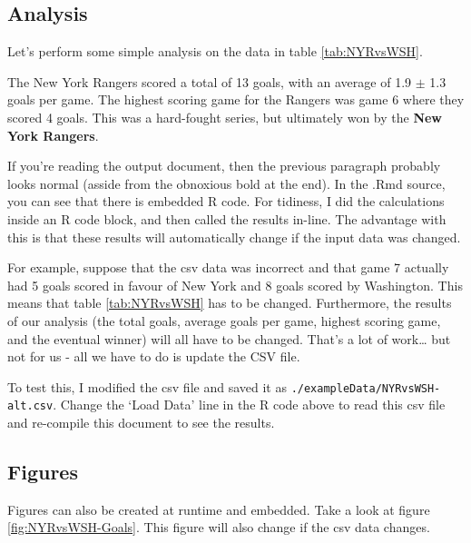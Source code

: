 \documentclass[]{article}
\begin{document}
\subsection{Analysis}\label{analysis}

Let's perform some simple analysis on the data in table
\ref{tab:NYRvsWSH}.

The New York Rangers scored a total of 13 goals, with an average of 1.9
\(\pm\) 1.3 goals per game. The highest scoring game for the Rangers was
game 6 where they scored 4 goals. This was a hard-fought series, but
ultimately won by the \textbf{New York Rangers}.

If you're reading the output document, then the previous paragraph
probably looks normal (asside from the obnoxious bold at the end). In
the .Rmd source, you can see that there is embedded R code. For
tidiness, I did the calculations inside an R code block, and then called
the results in-line. The advantage with this is that these results will
automatically change if the input data was changed.

For example, suppose that the csv data was incorrect and that game 7
actually had 5 goals scored in favour of New York and 8 goals scored by
Washington. This means that table \ref{tab:NYRvsWSH} has to be changed.
Furthermore, the results of our analysis (the total goals, average goals
per game, highest scoring game, and the eventual winner) will all have
to be changed. That's a lot of work\ldots{} but not for us - all we have
to do is update the CSV file.

To test this, I modified the csv file and saved it as
\texttt{./exampleData/NYRvsWSH-alt.csv}. Change the `Load Data' line in
the R code above to read this csv file and re-compile this document to
see the results.

\subsection{Figures}\label{figures}

Figures can also be created at runtime and embedded. Take a look at
figure \ref{fig:NYRvsWSH-Goals}. This figure will also change if the csv
data changes.
\end{document}

